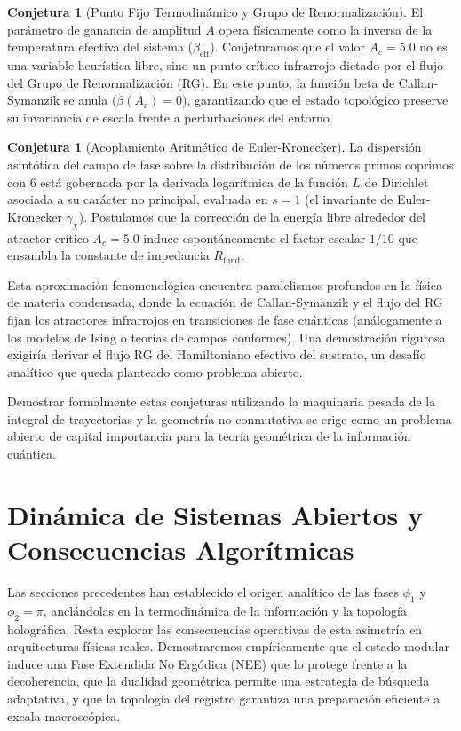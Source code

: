 \documentclass[12pt,a4paper]{article}
\theoremstyle{plain}
\theoremstyle{definition}
\newtheorem{conjetura}[teorema]{Conjetura}
\theoremstyle{remark}
\begin{document}
\begin{conjetura}[Punto Fijo Termodinámico y Grupo de Renormalización]
El parámetro de ganancia de amplitud $A$ opera físicamente como la inversa de la temperatura efectiva del sistema ($\beta_{\text{eff}}$). Conjeturamos que el valor $A_c = 5.0$ no es una variable heurística libre, sino un punto crítico infrarrojo dictado por el flujo del Grupo de Renormalización (RG). En este punto, la función beta de Callan-Symanzik se anula ($\beta(A_c)=0$), garantizando que el estado topológico preserve su invariancia de escala frente a perturbaciones del entorno.
\end{conjetura}

\begin{conjetura}[Acoplamiento Aritmético de Euler-Kronecker]
La dispersión asintótica del campo de fase sobre la distribución de los números primos coprimos con 6 está gobernada por la derivada logarítmica de la función $L$ de Dirichlet asociada a su carácter no principal, evaluada en $s=1$ (el invariante de Euler-Kronecker $\gamma_{\chi}$). Postulamos que la corrección de la energía libre alrededor del atractor crítico $A_c=5.0$ induce espontáneamente el factor escalar $1/10$ que ensambla la constante de impedancia $R_{\text{fund}}$.
\end{conjetura}

Esta aproximación fenomenológica encuentra paralelismos profundos en la física de materia condensada, donde la ecuación de Callan-Symanzik y el flujo del RG fijan los atractores infrarrojos en transiciones de fase cuánticas (análogamente a los modelos de Ising o teorías de campos conformes). Una demostración rigurosa exigiría derivar el flujo RG del Hamiltoniano efectivo del sustrato, un desafío analítico que queda planteado como problema abierto.

Demostrar formalmente estas conjeturas utilizando la maquinaria pesada de la integral de trayectorias y la geometría no conmutativa se erige como un problema abierto de capital importancia para la teoría geométrica de la información cuántica.

\section{Dinámica de Sistemas Abiertos y Consecuencias Algorítmicas}
\label{sec:consecuencias}

Las secciones precedentes han establecido el origen analítico de las fases $\phi_1$ y $\phi_2 = \pi$, anclándolas en la termodinámica de la información y la topología holográfica. Resta explorar las consecuencias operativas de esta asimetría en arquitecturas físicas reales. Demostraremos empíricamente que el estado modular induce una Fase Extendida No Ergódica (NEE) que lo protege frente a la decoherencia, que la dualidad geométrica permite una estrategia de búsqueda adaptativa, y que la topología del registro garantiza una preparación eficiente a excala macroscópica.
\end{document}
